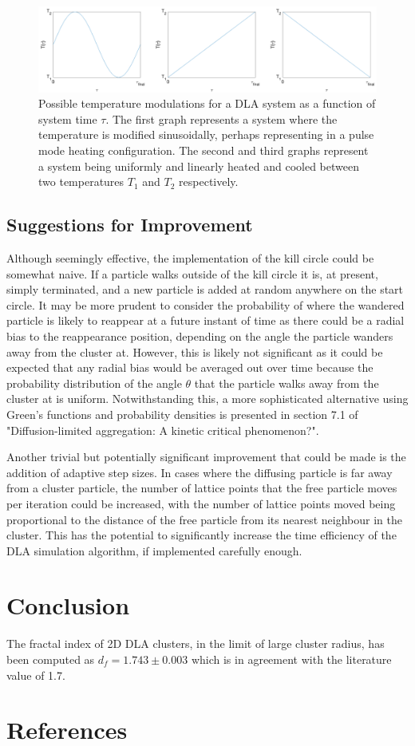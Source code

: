 \documentclass[11pt]{iopart}
\begin{document}
\begin{figure}[t]
  \centering
  \includegraphics[width=\linewidth]{images/temps.png}
  \caption{Possible temperature modulations for a DLA system as a function of system time $\tau$. The first graph represents a system where the temperature is modified sinusoidally, perhaps representing in a pulse mode heating configuration. The second and third graphs represent a system being uniformly and linearly heated and cooled between two temperatures $T_1$ and $T_2$ respectively.}
  \label{fig:temps}
\end{figure}

\subsection{Suggestions for Improvement}
Although seemingly effective, the implementation of the kill circle could be somewhat naive. If a particle walks outside of the kill circle it is, at present, simply terminated, and a new particle is added at random anywhere on the start circle. It may be more prudent to consider the probability of where the wandered particle is likely to reappear at a future instant of time as there could be a radial bias to the reappearance position, depending on the angle the particle wanders away from the cluster at. However, this is likely not significant as it could be expected that any radial bias would be averaged out over time because the probability distribution of the angle $\theta$ that the particle walks away from the cluster at is uniform.  Notwithstanding this, a more sophisticated alternative using Green's functions and probability densities is presented in section 7.1 of "Diffusion-limited aggregation: A kinetic critical phenomenon?"\cite{dla2}. 

Another trivial but potentially significant improvement that could be made is the addition of adaptive step sizes. In cases where the diffusing particle is far away from a cluster particle, the number of lattice points that the free particle moves per iteration could be increased, with the number of lattice points moved being proportional to the distance of the free particle from its nearest neighbour in the cluster. This has the potential to significantly increase the time efficiency of the DLA simulation algorithm, if implemented carefully enough.

\section{Conclusion}
The fractal index of 2D DLA clusters, in the limit of large cluster radius, has been computed as $d_f = 1.743 \pm 0.003$ which is in agreement with the literature value of 1.7\cite{fractalindexref}.

\section*{References}


\end{document}
